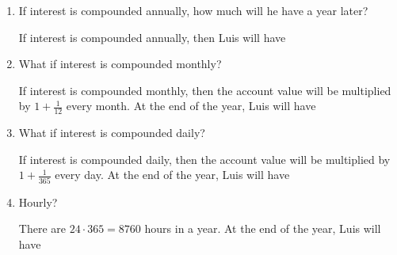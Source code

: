 \documentclass[main]{subfiles}
\begin{document}
\begin{enumerate}
    \begin{enumerate}[topsep=0pt]
      \item 
      \begin{problem}
      If interest is compounded annually, how much will he have a year later?
      \end{problem}

      \begin{solution}
        If interest is compounded annually, then Luis will 
        have 
      \end{solution}


      \item 
      \begin{problem}
      What if interest is compounded monthly?
      \end{problem}

      \begin{solution}
        If interest is compounded monthly, then the account value will be 
        multiplied by $1+\frac{1}{12}$ every month. At the end of the year, Luis 
        will have
      \end{solution}

      \pspace{\newpage}

      \item 
      \begin{problem}
      What if interest is compounded daily?
      \end{problem}

      \begin{solution}
        If interest is compounded daily, then the account value will be multiplied
        by $1+\frac{1}{365}$ every day. At the end of the year, Luis will have
      \end{solution}


      \item 
      \begin{problem}
      Hourly?
      \end{problem}

      \begin{solution}
        There are $24 \cdot 365 = 8760$ hours in a year. At the end of the year, 
        Luis will have
      \end{solution}


\end{enumerate}
\end{enumerate}
\end{document}
